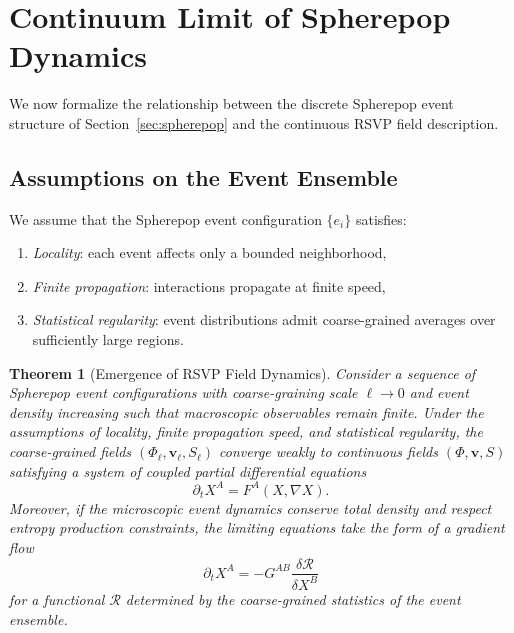 \documentclass[12pt,a4paper]{article}
\theoremstyle{plain}
\newtheorem{theorem}{Theorem}
\theoremstyle{definition}
\theoremstyle{remark}
\begin{document}
\section{Continuum Limit of Spherepop Dynamics}
\label{sec:continuumlimit}

We now formalize the relationship between the discrete Spherepop event
structure of Section~\ref{sec:spherepop} and the continuous RSVP field
description.

\subsection{Assumptions on the Event Ensemble}

We assume that the Spherepop event configuration $\{e_i\}$ satisfies:
\begin{enumerate}
\item \emph{Locality}: each event affects only a bounded neighborhood,
\item \emph{Finite propagation}: interactions propagate at finite speed,
\item \emph{Statistical regularity}: event distributions admit
coarse-grained averages over sufficiently large regions.
\end{enumerate}

\begin{theorem}[Emergence of RSVP Field Dynamics]
\label{thm:reduction}
Consider a sequence of Spherepop event configurations with
coarse-graining scale $\ell \to 0$ and event density increasing such
that macroscopic observables remain finite. Under the assumptions of
locality, finite propagation speed, and statistical regularity, the
coarse-grained fields $(\Phi_\ell, \mathbf{v}_\ell, S_\ell)$ converge
weakly to continuous fields $(\Phi, \mathbf{v}, S)$ satisfying a system
of coupled partial differential equations
\begin{equation}
\partial_t X^A = F^A(X,\nabla X).
\end{equation}
Moreover, if the microscopic event dynamics conserve total density
and respect entropy production constraints, the limiting equations
take the form of a gradient flow
\begin{equation}
\partial_t X^A = -G^{AB}\frac{\delta \mathcal{R}}{\delta X^B}
\end{equation}
for a functional $\mathcal{R}$ determined by the coarse-grained
statistics of the event ensemble.
\end{theorem}
\end{document}
